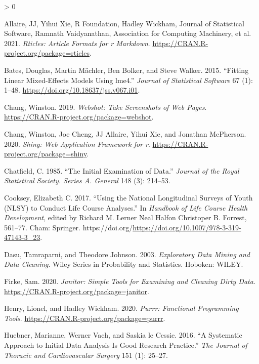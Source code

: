 \documentclass{article}
\newlength{\cslhangindent}
\newenvironment{CSLReferences}[2] %
 {%
  \setlength{\parindent}{0pt}
  \ifodd #1 \everypar{\setlength{\hangindent}{\cslhangindent}}\ignorespaces\fi
  \ifnum #2 > 0
  \setlength{\parskip}{#2\baselineskip}
  \fi
 }%
 {}
\begin{document}
\hypertarget{refs}{}
\begin{CSLReferences}{1}{0}
\leavevmode\hypertarget{ref-rticles}{}%
Allaire, JJ, Yihui Xie, R Foundation, Hadley Wickham, Journal of Statistical Software, Ramnath Vaidyanathan, Association for Computing Machinery, et al. 2021. \emph{Rticles: Article Formats for r Markdown}. \url{https://CRAN.R-project.org/package=rticles}.

\leavevmode\hypertarget{ref-lme4}{}%
Bates, Douglas, Martin Mächler, Ben Bolker, and Steve Walker. 2015. {``Fitting Linear Mixed-Effects Models Using {lme4}.''} \emph{Journal of Statistical Software} 67 (1): 1--48. \url{https://doi.org/10.18637/jss.v067.i01}.

\leavevmode\hypertarget{ref-webshot}{}%
Chang, Winston. 2019. \emph{Webshot: Take Screenshots of Web Pages}. \url{https://CRAN.R-project.org/package=webshot}.

\leavevmode\hypertarget{ref-shiny}{}%
Chang, Winston, Joe Cheng, JJ Allaire, Yihui Xie, and Jonathan McPherson. 2020. \emph{Shiny: Web Application Framework for r}. \url{https://CRAN.R-project.org/package=shiny}.

\leavevmode\hypertarget{ref-Chatfield1985TIEo}{}%
Chatfield, C. 1985. {``The Initial Examination of Data.''} \emph{Journal of the Royal Statistical Society. Series A. General} 148 (3): 214--53.

\leavevmode\hypertarget{ref-eliznlsy}{}%
Cooksey, Elizabeth C. 2017. {``Using the National Longitudinal Surveys of Youth (NLSY) to Conduct Life Course Analyses.''} In \emph{Handbook of Life Course Health Development}, edited by Richard M. Lerner Neal Halfon Christoper B. Forrest, 561--77. Cham: Springer. https://doi.org/\url{https://doi.org/10.1007/978-3-319-47143-3_23}.

\leavevmode\hypertarget{ref-DasuTamraparni2003Edma}{}%
Dasu, Tamraparni, and Theodore Johnson. 2003. \emph{Exploratory Data Mining and Data Cleaning}. Wiley Series in Probability and Statistics. Hoboken: WILEY.

\leavevmode\hypertarget{ref-janitor}{}%
Firke, Sam. 2020. \emph{Janitor: Simple Tools for Examining and Cleaning Dirty Data}. \url{https://CRAN.R-project.org/package=janitor}.

\leavevmode\hypertarget{ref-purrr}{}%
Henry, Lionel, and Hadley Wickham. 2020. \emph{Purrr: Functional Programming Tools}. \url{https://CRAN.R-project.org/package=purrr}.

\leavevmode\hypertarget{ref-HuebnerMariannePhD2016Asat}{}%
Huebner, Marianne, Werner Vach, and Saskia le Cessie. 2016. {``A Systematic Approach to Initial Data Analysis Is Good Research Practice.''} \emph{The Journal of Thoracic and Cardiovascular Surgery} 151 (1): 25--27.


\end{CSLReferences}
\end{document}
